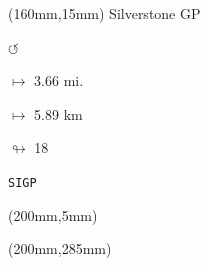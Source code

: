 \begin{textblock*}{40mm}(160mm,15mm)%
Silverstone GP
\par \Huge$\circlearrowleft$
\Large
\par$\mapsto$ 3.66 mi.
\par$\mapsto$ 5.89 km
\par$\looparrowright$ 18
\par\hfill\tiny\tt SIGP\\
\end{textblock*}
\begin{textblock*}{20mm}(200mm,5mm)%
\fbox{\thepage}
\end{textblock*}
\begin{textblock*}{20mm}(200mm,285mm)%
\fbox{\thepage}
\end{textblock*}
\null\newpage

